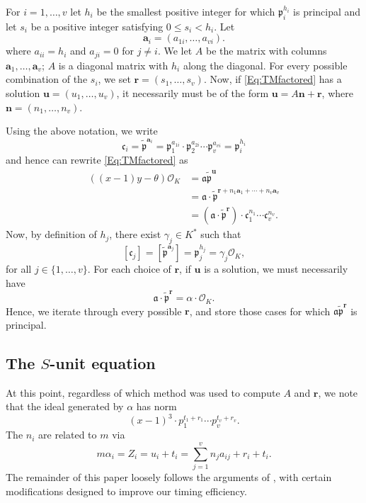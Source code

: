 {For $i = 1, \dots, v$ let $h_i$ be the smallest positive integer for which $\mathfrak{p}_i^{h_i}$ is principal and let 
$s_i$ be a positive integer satisfying $0 \leq s_i < h_i$. Let
\[\mathbf{a}_i = (a_{1i}, \dots, a_{vi}).\]
where $a_{ii} = h_i$ and $a_{ji} = 0$ for $j \neq i$. We let $A$ be the matrix with columns $\mathbf{a}_1, \dots, \mathbf{a}_v$; $A$ is a diagonal matrix with $h_i$ along the diagonal. For every possible combination of the $s_i$, we set $\mathbf{r} = (s_1, \dots, s_v)$. Now, if \eqref{Eq:TMfactored} has a solution $\mathbf{u} = (u_1, \dots, u_v)$, it necessarily must be of the form $\mathbf{u} = A\mathbf{n} + \mathbf{r}$, where $\mathbf{n} = (n_1, \dots, n_v)$. 

Using the above notation, we write
$$
\mathfrak{c}_i = \tilde{\mathfrak{p}}^{\mathbf{a}_i}=\mathfrak{p}_1^{a_{1i}}\cdot \mathfrak{p}_2^{a_{2i}} \cdots \mathfrak{p}_v^{a_{vi}} = \mathfrak{p}_i^{h_i}
$$
and hence can rewrite \eqref{Eq:TMfactored} as
\[\begin{array}{ll}
((x-1) y-\theta) \mathcal{O}_K 
	& = \mathfrak{a} \tilde{\mathfrak{p}}^{\mathbf{u}}\\ 
	& = \mathfrak{a} \cdot \tilde{\mathfrak{p}}^{\mathbf{r} + n_1 \mathbf{a}_1 + \cdots + n_v \mathbf{a}_v}\\
	& = (\mathfrak{a} \cdot \tilde{\mathfrak{p}}^\mathbf{r}) \cdot \mathfrak{c}_1^{n_1}\cdots \mathfrak{c}_v^{n_v}.
\end{array}\]
Now, by definition of $h_j$, there exist $\gamma_j \in K^*$ such that 
\[[\mathfrak{c}_j] = [\tilde{\mathfrak{p}}^{\mathbf{a}_j}] = \mathfrak{p}_j^{h_j} = \gamma_j \mathcal{O}_K,\]
for all $j \in \{1, \dots, v\}$. For each choice of $\mathbf{r}$, if $\mathbf{u}$ is a solution, we must necessarily have
\[\mathfrak{a} \cdot \tilde{\mathfrak{p}}^\mathbf{r}=\alpha \cdot \mathcal{O}_K.\]
Hence, we iterate through every possible $\mathbf{r}$, and store those cases for which $\mathfrak{a}\tilde{\mathfrak{p}}^{\mathbf{r}}$ is principal. 

\subsection{The $S$-unit equation}

At this point, regardless of which method was used to compute $A$ and $\mathbf{r}$, we note that the ideal generated by $\alpha$ has norm
\[(x-1)^3\cdot p_1^{t_1 + r_1} \cdots p_v^{t_v + r_v}.\]
The $n_i$ are related to $m$ via
\[m \alpha_i = Z_i = u_i + t_i = \sum_{j = 1}^{v}n_ja_{ij} + r_i + t_i.\]
The remainder of this paper loosely follows the arguments of \cite{TW3}, with certain modifications designed to improve our timing efficiency. 

}
